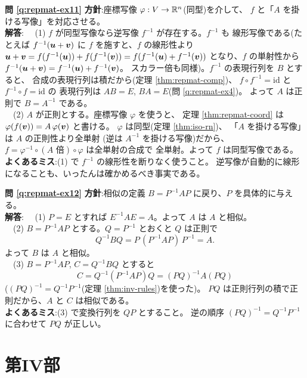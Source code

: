 \bigskip
\noindent\textbf{問 \ref{q:repmat-ex11}}\quad
\textbf{方針}:座標写像 $\varphi : V \to \mathbb{R}^n$(同型)を介して、
$f$ と「$A$ を掛ける写像」を対応させる。\\
\textbf{解答}:
　(1) $f$ が同型写像なら逆写像 $f^{-1}$ が存在する。$f^{-1}$ も
線形写像である(たとえば
$f^{-1}(\bm{u} + \bm{v})$ に $f$ を施すと、$f$ の線形性より
$\bm{u} + \bm{v} = f(f^{-1}(\bm{u})) + f(f^{-1}(\bm{v}))
= f(f^{-1}(\bm{u}) + f^{-1}(\bm{v}))$ となり、$f$ の単射性から
$f^{-1}(\bm{u} + \bm{v}) = f^{-1}(\bm{u}) + f^{-1}(\bm{v})$。
スカラー倍も同様)。$f^{-1}$ の表現行列を $B$ とすると、
合成の表現行列は積だから(定理 \ref{thm:repmat-comp})、
$f \circ f^{-1} = \mathrm{id}$ と $f^{-1} \circ f = \mathrm{id}$ の
表現行列は $AB = E$, $BA = E$(問 \ref{q:repmat-ex4})。
よって $A$ は正則で $B = A^{-1}$ である。\\
　(2) $A$ が正則とする。座標写像 $\varphi$ を使うと、
定理 \ref{thm:repmat-coord} は
$\varphi(f(\bm{v})) = A\,\varphi(\bm{v})$ と書ける。
$\varphi$ は同型(定理 \ref{thm:iso-rn})、
「$A$ を掛ける写像」は $A$ の正則性より全単射
(逆は $A^{-1}$ を掛ける写像)だから、
$f = \varphi^{-1} \circ (A \text{ 倍}) \circ \varphi$ は全単射の合成で
全単射。よって $f$ は同型写像である。\\
\textbf{よくあるミス}:(1) で $f^{-1}$ の線形性を断りなく使うこと。
逆写像が自動的に線形になることも、いったんは確かめるべき事実である。

\bigskip
\noindent\textbf{問 \ref{q:repmat-ex12}}\quad
\textbf{方針}:相似の定義 $B = P^{-1}AP$ に戻り、$P$ を具体的に与える。\\
\textbf{解答}:
　(1) $P = E$ とすれば $E^{-1}AE = A$。よって $A$ は $A$ と相似。\\
　(2) $B = P^{-1}AP$ とする。$Q = P^{-1}$ とおくと $Q$ は正則で
\[
Q^{-1}BQ = P\,(P^{-1}AP)\,P^{-1} = A.
\]
よって $B$ は $A$ と相似。\\
　(3) $B = P^{-1}AP$, $C = Q^{-1}BQ$ とすると
\[
C = Q^{-1}(P^{-1}AP)Q = (PQ)^{-1}A(PQ)
\]
($(PQ)^{-1} = Q^{-1}P^{-1}$(定理 \ref{thm:inv-rules})を使った)。
$PQ$ は正則行列の積で正則だから、$A$ と $C$ は相似である。\\
\textbf{よくあるミス}:(3) で変換行列を $QP$ とすること。
逆の順序 $(PQ)^{-1} = Q^{-1}P^{-1}$ に合わせて $PQ$ が正しい。

\section*{第IV部}

